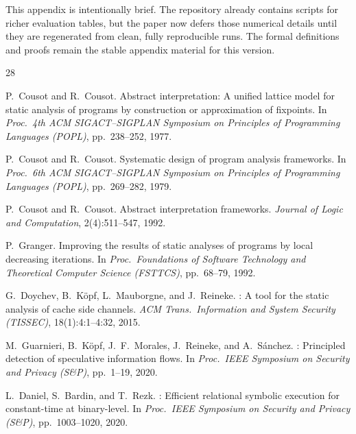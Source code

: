 \documentclass{article}
\theoremstyle{definition}
\theoremstyle{remark}
\begin{document}
This appendix is intentionally brief. The repository already contains scripts
for richer evaluation tables, but the paper now defers those numerical details
until they are regenerated from clean, fully reproducible runs. The formal
definitions and proofs remain the stable appendix material for this version.


\begin{thebibliography}{28}

P.~Cousot and R.~Cousot.
\newblock Abstract interpretation: A unified lattice model for static analysis
  of programs by construction or approximation of fixpoints.
\newblock In \emph{Proc.\ 4th ACM SIGACT--SIGPLAN Symposium on Principles of
  Programming Languages (POPL)}, pp.\ 238--252, 1977.

P.~Cousot and R.~Cousot.
\newblock Systematic design of program analysis frameworks.
\newblock In \emph{Proc.\ 6th ACM SIGACT--SIGPLAN Symposium on Principles of
  Programming Languages (POPL)}, pp.\ 269--282, 1979.

P.~Cousot and R.~Cousot.
\newblock Abstract interpretation frameworks.
\newblock \emph{Journal of Logic and Computation}, 2(4):511--547, 1992.

P.~Granger.
\newblock Improving the results of static analyses of programs by local
  decreasing iterations.
\newblock In \emph{Proc.\ Foundations of Software Technology and Theoretical
  Computer Science (FSTTCS)}, pp.\ 68--79, 1992.

G.~Doychev, B.~K\"{o}pf, L.~Mauborgne, and J.~Reineke.
: A tool for the static analysis of cache side channels.
\newblock \emph{ACM Trans.\ Information and System Security (TISSEC)},
  18(1):4:1--4:32, 2015.

M.~Guarnieri, B.~K\"{o}pf, J.~F.~Morales, J.~Reineke, and
  A.~S\'{a}nchez.
: Principled detection of speculative information flows.
\newblock In \emph{Proc.\ IEEE Symposium on Security and Privacy (S\&P)},
  pp.\ 1--19, 2020.

L.~Daniel, S.~Bardin, and T.~Rezk.
: Efficient relational symbolic execution for
  constant-time at binary-level.
\newblock In \emph{Proc.\ IEEE Symposium on Security and Privacy (S\&P)},
  pp.\ 1003--1020, 2020.


\end{thebibliography}
\end{document}
